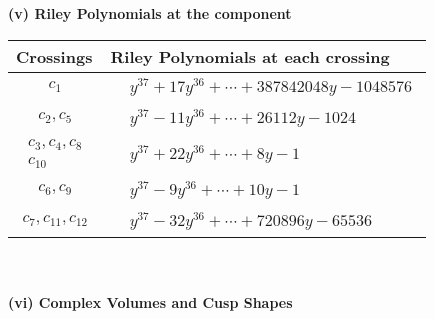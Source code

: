 \documentclass[1p]{elsarticle_modified}
\theoremstyle{definition}
\begin{document}
\newpage\renewcommand{\arraystretch}{1}
\flushleft \textbf{(v) Riley Polynomials at the component}\newline \\
\begin{tabular}{m{50pt}|m{274pt}}
Crossings & \hspace{64pt}Riley Polynomials at each crossing \\
\hline $$\begin{aligned}c_{1}\end{aligned}$$&$\begin{aligned}
&y^{37}+17 y^{36}+\cdots+387842048 y-1048576
\end{aligned}$\\
\hline $$\begin{aligned}c_{2},c_{5}\end{aligned}$$&$\begin{aligned}
&y^{37}-11 y^{36}+\cdots+26112 y-1024
\end{aligned}$\\
\hline $$\begin{aligned}c_{3},c_{4},c_{8}\\c_{10}\end{aligned}$$&$\begin{aligned}
&y^{37}+22 y^{36}+\cdots+8 y-1
\end{aligned}$\\
\hline $$\begin{aligned}c_{6},c_{9}\end{aligned}$$&$\begin{aligned}
&y^{37}-9 y^{36}+\cdots+10 y-1
\end{aligned}$\\
\hline $$\begin{aligned}c_{7},c_{11},c_{12}\end{aligned}$$&$\begin{aligned}
&y^{37}-32 y^{36}+\cdots+720896 y-65536
\end{aligned}$\\
\hline
\end{tabular}\\~\\
\newpage\flushleft \textbf{(vi) Complex Volumes and Cusp Shapes}
\end{document}
